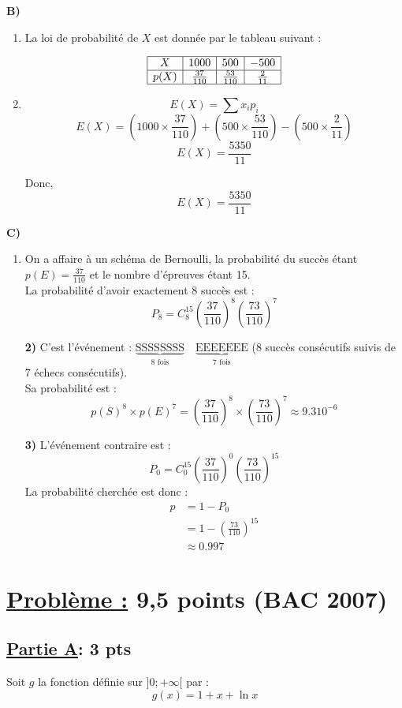 \documentclass[12pt,a4paper]{article}
\begin{document}
\textbf{B)}
\begin{enumerate}
    \item  La loi de probabilité de $X$ est donnée par le tableau suivant :

\[
\begin{array}{|c|c|c|c|}
\hline
X & 1000 & 500 & -500 \\
\hline
p(X) & \frac{37}{110} & \frac{53}{110} & \frac{2}{11} \\
\hline
\end{array}
\]

\item 
\[
E(X) = \sum x_i p_i
\]
\[
E(X) = \left(1000 \times \frac{37}{110}\right) + \left(500 \times \frac{53}{110}\right) - \left(500 \times \frac{2}{11}\right)
\]
\[
E(X) = \frac{5350}{11}
\]

Donc, 
\[
E(X) = \frac{5350}{11}
\]
\end{enumerate}

\textbf{C)}
\begin{enumerate}
    \item On a affaire à un schéma de Bernoulli, la probabilité du succès étant $p(E) = \frac{37}{110}$ et le nombre d'épreuves étant 15.\\
La probabilité d'avoir exactement 8 succès est :
\[
P_8 = C_8^{15} \left( \frac{37}{110} \right)^8 \left( \frac{73}{110} \right)^7
\]

\textbf{2)} C'est l'événement : $\underbrace{\text{SSSSSSSS}}_{\text{8 fois}} \quad 
\underbrace{\text{EEEEEEE}}_{\text{7 fois}}$ (8 succès consécutifs suivis de 7 échecs consécutifs).\\
Sa probabilité est :
\[
p(S)^8 \times p(E)^7 = \left( \frac{37}{110} \right)^8 \times \left( \frac{73}{110} \right)^7 \approx 9.310^{-6}
\]

\textbf{3)} L'événement contraire est : 
\[
P_0 = C_0^{15} \left( \frac{37}{110} \right)^0 \left( \frac{73}{110} \right)^{15}
\]
La probabilité cherchée est donc :
\[
\begin{aligned}
    p &= 1 - P_0\\
    &= 1 - \left( \frac{73}{110} \right)^{15}\\
    &\approx 0.997
\end{aligned}
\]
\end{enumerate}
\section*{\underline{Problème :} 9,5 points (BAC 2007)}
\subsection*{\underline{\textbf{Partie A}}:\textbf{ 3 pts}}
Soit $g$ la fonction définie sur $]0 ; +\infty[$ par :
\[
g(x) = 1 + x + \ln x
\]
\end{document}

